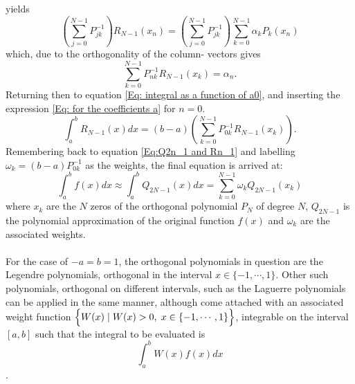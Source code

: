 \documentclass[10pt,a4paper]{article}
\begin{document}
yields
\begin{equation*}
\left( \sum\limits_{j=0}^{N-1}P_{jk}^{-1} \right)R_{N-1}(x_n) = \left( \sum\limits_{j=0}^{N-1}P_{jk}^{-1} \right)\sum\limits_{k=0}^{N-1} \alpha_k P_k(x_n)
\end{equation*}
which, due to the orthogonality of the column- vectors gives
\begin{equation}\label{Eq: for the coefficients a}
\sum\limits_{k=0}^{N-1}P_{nk}^{-1}R_{N-1}(x_k) = \alpha_n.
\end{equation}
Returning then to equation \ref{Eq: integral as a function of a0}, and inserting the expression \ref{Eq: for the coefficients a} for $n=0$.
\begin{equation}
\int_{a}^bR_{N-1}(x)dx = (b-a)\left( \sum\limits_{k=0}^{N-1}P_{0k}^{-1} R_{N-1}(x_k)\right).
\end{equation}
Remembering back to equation \ref{Eq:Q2n_1 and Rn_1} and labelling $\omega_k =(b-a)P_{0k}^{-1}$ as the weights, the final equation is arrived at:
\begin{equation}
\int_{a}^bf(x)dx \approx \int_{a}^bQ_{2N-1}(x)dx=\sum\limits_{k=0}^{N-1}\omega_k Q_{2N-1}(x_k)
\end{equation}
where $x_k$ are the $N$ zeros of the orthogonal polynomial $P_N$ of degree $N$, $Q_{2N-1}$ is the polynomial approximation of the original function $f(x)$ and $\omega_k$ are the associated weights.\\\\For the case of $-a=b=1$, the orthogonal polynomials in question are the Legendre polynomials, orthogonal in the interval $x\in \{-1,\cdots,1\}$. Other such polynomials, orthogonal on different intervals, such as the Laguerre polynomials can be applied in the same manner, although come attached with an associated weight function $\Big \{W(x)\hspace{1mm}|\hspace{1mm} W(x)>0,\hspace{1mm}x \in \{-1,\cdots,1\}\Big \}$, integrable on the interval $[a,b]$ such that the integral to be evaluated is 
$$
\int_a^b W(x)f(x)dx
$$\cite{Lecture_Notes_Fall_2015}.
\end{document}
